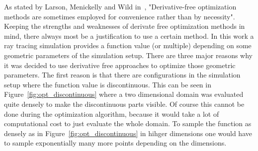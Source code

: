 \documentclass[a4paper,10pt]{article}
\newcommand{\figref}[1]{Figure~\ref{#1}}
\begin{document}
    As stated by Larson, Menickelly and Wild in~\cite{derivative_free_methods},
    "Derivative-free optimization methods are sometimes employed for 
    convenience rather than by necessity".
    Keeping the strengths and weaknesses of derivate free optimization
    methods in mind, there always most be a justification to use
    a certain method.
    In this work a ray tracing simulation provides a function value
    (or multiple) depending on some geometric parameters of the 
    simulation setup.
    There are three major reasons why it was decided to use derivative
    free approaches to optimize those geometric parameters.
    The first reason is that there are configurations in the
    simulation setup where the function value is discontinuous.
    This can be seen in \figref{fig:opt_discontinuous} where a two
    dimensional domain was evaluated quite densely to make the discontinuous
    parts visible.
    Of course this cannot be done during the optimization algorithm, 
    because it would take a lot of computational cost to just evaluate
    the whole domain.
    To sample the function as densely as in \figref{fig:opt_discontinuous}
    in hihger dimensions one would have to sample exponentially many
    more points depending on the dimensions.
\end{document}
